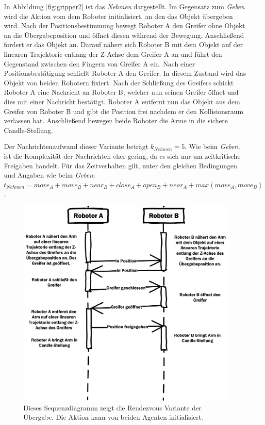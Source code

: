 In Abbildung \ref{fig:gripper2} ist das \textit{Nehmen} dargestellt. Im Gegensatz zum \textit{Geben} wird die Aktion vom dem Roboter initialisiert, an den das Objekt übergeben wird. Nach der Positionsbestimmung bewegt Roboter A den Greifer ohne Objekt an die Übergabeposition und öffnet diesen während der Bewegung. Anschließend fordert er das Objekt an. Darauf nähert sich Roboter B mit dem Objekt auf der linearen Trajektorie entlang der Z-Achse dem Greifer A an und führt den Gegenstand zwischen den Fingern von Greifer A ein. Nach einer Positionsbestätigung schließt Roboter A den Greifer. In diesem Zustand wird das Objekt von beiden Robotern fixiert. Nach der Schließung des Greifers schickt Roboter A eine Nachricht an Roboter B, welcher nun seinen Greifer öffnet und dies mit einer Nachricht bestätigt. Roboter A entfernt nun das Objekt aus dem Greifer von Roboter B und gibt die Position frei nachdem er den Kollisionsraum verlassen hat. Anschließend bewegen beide Roboter die Arme in die sichere Candle-Stellung.

Der Nachrichtenaufwand dieser Variante beträgt $k_{Nehmen} = 5$. Wie beim \textit{Geben}, ist die Komplexität der Nachrichten eher gering, da es sich nur um zeitkritische Freigaben handelt. Für das Zeitverhalten gilt, unter den gleichen Bedingungen und Angaben wie beim \textit{Geben}: $t_{Nehmen} = move_A + move_B + near_B + close_A + open_B + near_A + max(move_A, move_B)$.


\begin{figure}
		\centering
	\includegraphics[scale=1.0]{fig/SeqRond}

\caption[Sequenzdiagramm Rendezvous]{Dieses Sequenzdiagramm zeigt die Rendezvous Variante der Übergabe. Die Aktion kann von beiden Agenten initialisiert.}
\label{fig:gripper3}
\end{figure}



